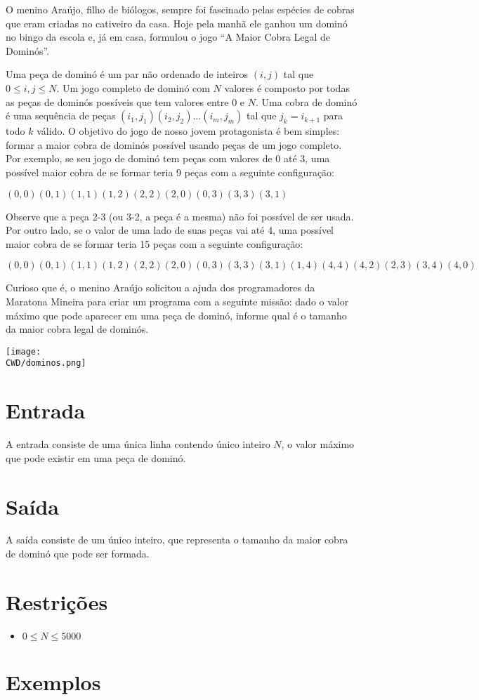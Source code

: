 O menino Araújo, filho de biólogos, sempre foi fascinado pelas espécies de cobras que eram criadas no cativeiro da casa.
 Hoje pela manhã ele ganhou um dominó no bingo da escola e, já em casa, formulou o jogo ``A Maior Cobra Legal de Dominós''.

Uma peça de dominó é um par não ordenado de inteiros $(i,j)$ tal que $0 \leq i, j \leq N$.
Um jogo completo de dominó com $N$ valores é composto por todas as peças de dominós possíveis que tem valores entre $0$ e $N$.
Uma cobra de dominó é uma sequência de peças $(i_1, j_1)(i_2, j_2)\dots(i_m, j_m)$ tal que $j_k = i_{k+1}$ para todo $k$ válido.
O objetivo do jogo de nosso jovem protagonista é bem simples: formar a maior cobra de dominós possível usando peças de um jogo completo.
 Por exemplo, se seu jogo de dominó tem peças com valores de $0$ até 3, uma possível maior cobra de se formar teria 9 peças com a seguinte configuração:

\begin{center}
  $( 0,0 )( 0,1 )( 1,1 )( 1,2 )( 2,2 )( 2,0 )( 0,3 )( 3,3 )( 3,1 )$
\end{center}

Observe que a peça 2-3 (ou 3-2, a peça é a mesma) não foi possível de ser usada.
Por outro lado, se o valor de uma lado de suas peças vai até 4, uma possível maior cobra de se formar teria 15 peças com a seguinte configuração:

\begin{center}
 $( 0,0 )( 0,1 )( 1,1 )( 1,2 )( 2,2 )( 2,0 )( 0,3 )( 3,3 )( 3,1 )( 1,4 )( 4,4 )( 4,2 )( 2,3 )( 3,4 )( 4,0 )$
\end{center}

Curioso que é, o menino Araújo solicitou a ajuda dos programadores da Maratona Mineira para criar um programa com a seguinte missão: dado o valor máximo que pode aparecer em uma peça de dominó, informe qual é o tamanho da maior cobra legal de dominós.


\begin{center}
  \texttt{[image: \\CWD/dominos.png]}
\end{center}


\section*{Entrada}

A entrada consiste de uma única linha contendo único inteiro $N$, o valor máximo que pode existir em uma peça de dominó.


\section*{Saída}

A saída consiste de um único inteiro, que representa o tamanho da maior cobra de dominó que pode ser formada.


\section*{Restrições}

\begin{itemize}
  \item $0 \leq N \leq 5000$
\end{itemize}

\section*{Exemplos}

\exemplo
